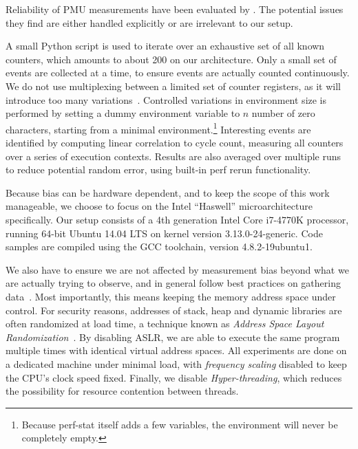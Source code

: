\documentclass[prodmode,acmtaco]{acmsmall}
\begin{document}
Reliability of PMU measurements have been evaluated by .
The potential issues they find are either handled explicitly or are irrelevant to our setup.

A small Python script is used to iterate over an exhaustive set of all known counters, which amounts to about 200 on our architecture.
Only a small set of events are collected at a time, to ensure events are actually counted continuously.
We do not use multiplexing between a limited set of counter registers, as it will introduce too many variations~\cite{Wiplove:ImproveEstimation}. %
Controlled variations in environment size is performed by setting a dummy environment variable to $n$ number of zero characters, starting from a minimal environment.\footnote{Because perf-stat itself adds a few variables, the environment will never be completely empty.}
Interesting events are identified by computing linear correlation to cycle count, measuring all counters over a series of execution contexts.
Results are also averaged over multiple runs to reduce potential random error, using built-in perf rerun functionality.

Because bias can be hardware dependent, and to keep the scope of this work manageable, we choose to focus on the Intel ``Haswell'' microarchitecture specifically.
Our setup consists of a 4th generation Intel\textsuperscript{\textregistered{}} Core\texttrademark{} i7-4770K processor, running 64-bit Ubuntu 14.04 LTS on kernel version 3.13.0-24-generic.
Code samples are compiled using the {\small GCC} toolchain, version 4.8.2-19ubuntu1.

We also have to ensure we are not affected by measurement bias beyond what we are actually trying to observe, and in general follow best practices on gathering data~\cite{Mytkowicz:2009:WrongData}.
Most importantly, this means keeping the memory address space under control.
For security reasons, addresses of stack, heap and dynamic libraries are often randomized at load time, a technique known as \emph{Address Space Layout Randomization}~\cite{Pax:ASLR,Bhatkar:AddressObfuscation}. 
By disabling ASLR, we are able to execute the same program multiple times with identical virtual address spaces.
All experiments are done on a dedicated machine under minimal load, with \emph{frequency scaling} disabled to keep the CPU's clock speed fixed.
Finally, we disable \emph{Hyper-threading}, which reduces the possibility for resource contention between threads.
\end{document}
